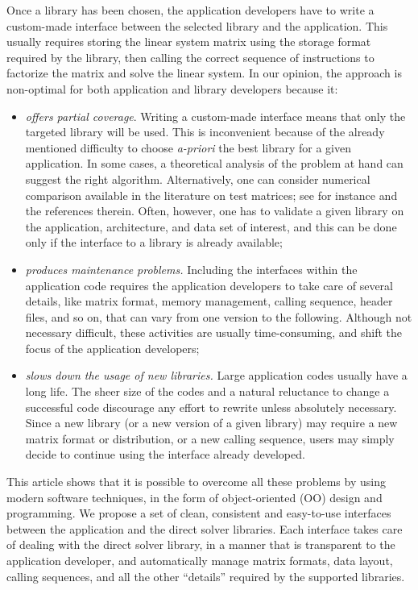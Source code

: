 \documentclass[acmtocl]{acmtrans2m}
\begin{document}
Once a library has been chosen, the application developers have to
write a custom-made interface between the selected library and
the application. This usually requires storing the linear system matrix using the
  storage format required by the library, then calling the correct sequence of
  instructions to factorize the matrix and solve the linear system.  In our
  opinion, the approach is non-optimal for both application and library
  developers because it:
\begin{itemize}

\item 
{\sl offers partial coverage}. Writing a custom-made interface means that only the
targeted library will be used.
This is inconvenient because of the already mentioned difficulty to choose
{\sl a-priori} the best library for a given application.
In some cases, a theoretical analysis of
the problem at hand can suggest the right algorithm. Alternatively, one can
consider numerical comparison available in the literature
on test matrices; see for instance \cite{amestoy01analysis,gupta01recent} and
the references therein. Often, however, one has to validate
a given library on the application, architecture, and data
set of interest, and this can be done only if the interface  to a library
is already available;

\item 
{\sl produces maintenance problems.}
Including the interfaces within the application code requires the application
developers to take care of several details, like matrix format, memory
management, calling sequence, header files, and so on, that can vary 
from one version to the following. Although not necessary difficult, these
activities are usually time-consuming, and shift the focus of the application
developers;

\item 
{\sl slows down the usage of new libraries.} 
Large application codes usually have a long life.  The sheer size of
the codes and a natural reluctance to change a successful code discourage any
effort to rewrite unless absolutely necessary.
Since a new library 
(or a new version of a given library) may require a new matrix format or
distribution, or a new calling sequence, users may simply decide to continue
using the interface already developed.
\end{itemize}

This article shows that it is possible to overcome all these problems by using
modern software techniques, in the form of object-oriented (OO) design and
programming.  We propose a set of clean, consistent and easy-to-use interfaces
between the application and the direct solver libraries.  Each interface takes
care of dealing with the direct solver library, in a manner that is
transparent to the application developer, and automatically manage matrix
formats, data layout, calling sequences, and all the other ``details''
required by the supported libraries. 
\end{document}
